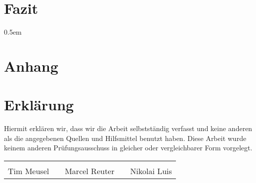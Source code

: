 \chapter{Fazit}


\printglossaries%

\begingroup
{}
\emergencystretch0.5em
\printbibliography[heading=bibnumbered]
\endgroup

\chapter{Anhang}


\FloatBarrier%

\FloatBarrier%


\chapter{Erklärung}
Hiermit erklären wir, dass wir die Arbeit selbstständig verfasst und keine
anderen als die angegebenen Quellen und Hilfsmittel benutzt haben. Diese Arbeit
wurde keinem anderen Prüfungsausschuss in gleicher oder vergleichbarer Form
vorgelegt.

\vspace{10ex}
{\centering
\renewcommand{\arraystretch}{0.9}
\begin{tabular}{p{}p{}p{}p{}p{}}
  \dotfill                    & & \dotfill                      & & \dotfill \\
  \centering\footnotesize{Tim Meusel}& & \centering\footnotesize{Marcel Reuter}& & \centering\footnotesize{Nikolai Luis}%
\end{tabular}
}

